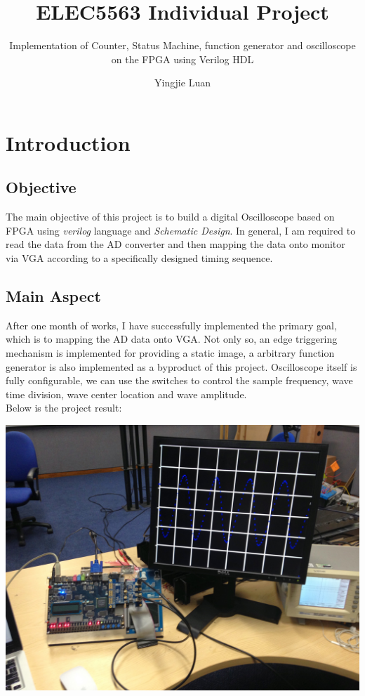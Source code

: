 \documentclass[11pt]{scrartcl}
\begin{document}
\title{ELEC5563 Individual Project}
\subtitle{ Implementation of Counter, Status Machine, function generator and oscilloscope on the FPGA using Verilog HDL}
\author{Yingjie Luan}
\maketitle

\tableofcontents

\section{Introduction}
\subsection{Objective}
The main objective of this project is to build a digital Oscilloscope based on FPGA using \textit{verilog} language and \textit{Schematic Design}. In general, I am required to read the data from the AD converter and then mapping the data onto monitor via VGA according to a specifically designed timing sequence.
\subsection{Main Aspect}
After one month of works, I have successfully implemented the primary goal, which is to mapping the AD data onto VGA. Not only so, an edge triggering mechanism is implemented for providing a static image, a arbitrary function generator is also implemented as a byproduct of this project. Oscilloscope itself is fully configurable, we can use the switches to control the sample frequency, wave time division, wave center location and wave amplitude. \\

Below is the project result:

\begin{center}
\begin{minipage}[t]{\linewidth}

{
\includegraphics[scale = 0.15]{IMG_1388.JPG}
}
\end{minipage}
\medskip
\end{center}
\end{document}

